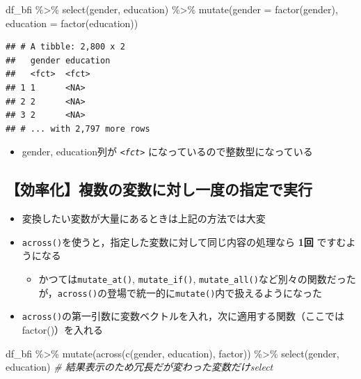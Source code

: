 \documentclass[
  xelatex,ja=standard, b5paper]{bxjsbook}
\newenvironment{Shaded}{\begin{snugshade}}{\end{snugshade}}
\newcommand{\AttributeTok}[1]{\textcolor[rgb]{0.77,0.63,0.00}{#1}}
\newcommand{\CommentTok}[1]{\textcolor[rgb]{0.56,0.35,0.01}{\textit{#1}}}
\newcommand{\FunctionTok}[1]{\textcolor[rgb]{0.00,0.00,0.00}{#1}}
\newcommand{\NormalTok}[1]{#1}
\newcommand{\SpecialCharTok}[1]{\textcolor[rgb]{0.00,0.00,0.00}{#1}}
\providecommand{\tightlist}{%
  \setlength{\itemsep}{0pt}\setlength{\parskip}{0pt}}
\begin{document}
\begin{Shaded}
\begin{Highlighting}[]
\NormalTok{df\_bfi }\SpecialCharTok{\%\textgreater{}\%}
  \FunctionTok{select}\NormalTok{(gender, education) }\SpecialCharTok{\%\textgreater{}\%} 
  \FunctionTok{mutate}\NormalTok{(}\AttributeTok{gender =} \FunctionTok{factor}\NormalTok{(gender),}
         \AttributeTok{education =} \FunctionTok{factor}\NormalTok{(education))}
\end{Highlighting}
\end{Shaded}

\begin{verbatim}
## # A tibble: 2,800 x 2
##   gender education
##   <fct>  <fct>    
## 1 1      <NA>     
## 2 2      <NA>     
## 3 2      <NA>     
## # ... with 2,797 more rows
\end{verbatim}

\begin{itemize}
\tightlist
\item
  gender, education列が \emph{\texttt{\textless{}fct\textgreater{}}} になっているので整数型になっている
\end{itemize}

\hypertarget{mu-kata-across}{%
\subsection{【効率化】複数の変数に対し一度の指定で実行}\label{mu-kata-across}}

\begin{itemize}
\tightlist
\item
  変換したい変数が大量にあるときは上記の方法では大変
\item
  \texttt{across()}を使うと，指定した変数に対して同じ内容の処理なら \textbf{1回} ですむようになる

  \begin{itemize}
  \tightlist
  \item
    かつては\texttt{mutate\_at()}, \texttt{mutate\_if()}, \texttt{mutate\_all()}など別々の関数だったが，\texttt{across()}の登場で統一的に\texttt{mutate()}内で扱えるようになった
  \end{itemize}
\item
  \texttt{across()}の第一引数に変数ベクトルを入れ，次に適用する関数（ここではfactor()）を入れる
\end{itemize}

\begin{Shaded}
\begin{Highlighting}[]
\NormalTok{df\_bfi }\SpecialCharTok{\%\textgreater{}\%}
  \FunctionTok{mutate}\NormalTok{(}\FunctionTok{across}\NormalTok{(}\FunctionTok{c}\NormalTok{(gender, education),}
\NormalTok{                factor)) }\SpecialCharTok{\%\textgreater{}\%} 
  \FunctionTok{select}\NormalTok{(gender, education)   }\CommentTok{\# 結果表示のため冗長だが変わった変数だけselect}
\end{Highlighting}
\end{Shaded}
\end{document}
